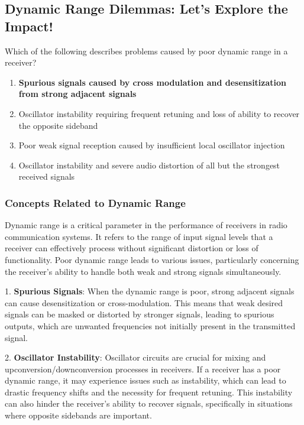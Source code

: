 \subsection{Dynamic Range Dilemmas: Let's Explore the Impact!}

\begin{tcolorbox}[colback=gray!10, colframe=black, title=E4D02`]
Which of the following describes problems caused by poor dynamic range in a receiver? 
\begin{enumerate}[label=\Alph*.]
    \item \textbf{Spurious signals caused by cross modulation and desensitization from strong adjacent signals}
    \item Oscillator instability requiring frequent retuning and loss of ability to recover the opposite sideband
    \item Poor weak signal reception caused by insufficient local oscillator injection
    \item Oscillator instability and severe audio distortion of all but the strongest received signals
\end{enumerate} \end{tcolorbox}

\subsubsection{Concepts Related to Dynamic Range}
Dynamic range is a critical parameter in the performance of receivers in radio communication systems. It refers to the range of input signal levels that a receiver can effectively process without significant distortion or loss of functionality. Poor dynamic range leads to various issues, particularly concerning the receiver's ability to handle both weak and strong signals simultaneously.

1. \textbf{Spurious Signals}: When the dynamic range is poor, strong adjacent signals can cause desensitization or cross-modulation. This means that weak desired signals can be masked or distorted by stronger signals, leading to spurious outputs, which are unwanted frequencies not initially present in the transmitted signal.

2. \textbf{Oscillator Instability}: Oscillator circuits are crucial for mixing and upconversion/downconversion processes in receivers. If a receiver has a poor dynamic range, it may experience issues such as instability, which can lead to drastic frequency shifts and the necessity for frequent retuning. This instability can also hinder the receiver's ability to recover signals, specifically in situations where opposite sidebands are important.

